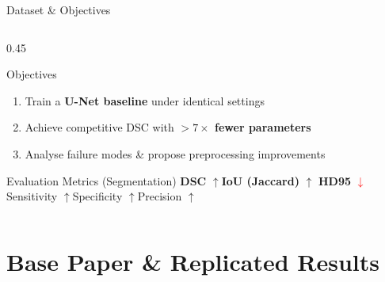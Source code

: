 \documentclass[aspectratio=169,10pt]{beamer}
\newcommand{\up}{\textcolor{accent}{$\uparrow$}}
\newcommand{\dn}{\textcolor{red}{$\downarrow$}}
\begin{document}
\begin{frame}{Dataset \& Objectives}
\begin{columns}[T]
\begin{column}{0.45\textwidth}
\begin{block}{Objectives}
\begin{enumerate}
          \item Train a \textbf{U-Net baseline} under identical settings
          \item Achieve competitive DSC with \textbf{$>7\times$ fewer parameters}
          \item Analyse failure modes \& propose preprocessing improvements
        \end{enumerate}
      \end{block}
      \vspace{4pt}
      \begin{exampleblock}{Evaluation Metrics (Segmentation)}
        \textbf{DSC} \up \quad \textbf{IoU (Jaccard)} \up \quad
        \textbf{HD95} \dn\\
        Sensitivity \up \quad Specificity \up \quad Precision \up
      \end{exampleblock}
    \end{column}
  \end{columns}
\end{frame}

\section{Base Paper \& Replicated Results}
\end{document}
